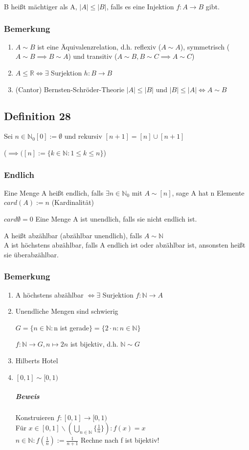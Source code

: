 \documentclass[fleqn]{scrbook}
\begin{document}
B heißt mächtiger als A, $|A| \leq |B|$, falls es eine Injektion $f: A \rightarrow B$ gibt.

\subsubsection{Bemerkung}
\begin{enumerate}[1)]
\item $A \sim B$ ist eine Äquivalenzrelation, d.h. reflexiv ($A \sim A$), symmetrisch ($A \sim B \implies B \sim A$) und transitiv ($A \sim B, B \sim C \implies A \sim C$)
\item $A \leq \mathbb{R} \iff \exists$ Surjektion $h: B \rightarrow B$
\item (Cantor) Bernsten-Schröder-Theorie $|A| \leq |B|$ und $|B| \leq |A| \iff A \sim B$
\end{enumerate}
\subsection{Definition 28}

Sei $n \in \mathbb{N}_0 [0] := \emptyset$ und rekursiv $[n + 1] = [n] \cup [n+1]$

($\implies([n]:=\{k \in \mathbb{N}: 1\leq k \leq n \}$)

\subsubsection{Endlich} Eine Menge A heißt endlich, falls $\exists n \in \mathbb{N}_0$ mit $A \sim [n]$, sage A hat n Elemente $card(A) := n$ (Kardinalität)

$card\emptyset = 0$ Eine Menge A ist unendlich, falls sie nicht endlich ist.

 A heißt abzählbar (abzählbar unendlich), falls $A \sim \mathbb{N}$\\A ist höchstens abzählbar, falls A endlich ist oder abzählbar ist, ansonsten heißt sie überabzählbar.
\subsubsection{Bemerkung}
\begin{enumerate}[1)]
\item A höchstens abzählbar $\iff \exists$ Surjektion $f: \mathbb{N} \rightarrow A$
\item Unendliche Mengen sind schwierig

$G = \{ n \in \mathbb{N}: $n ist gerade$\} = \{2 \cdot n: n \in \mathbb{N}\}$

$f:\mathbb{N}\rightarrow G, n \mapsto 2n$ ist bijektiv, d.h. $\mathbb{N} \sim G$
\item Hilberts Hotel
\item $[0,1]\sim [0,1)$
\subparagraph{Beweis} Konstruieren $f: [0,1] \rightarrow [0,1)$\\Für $x \in [0,1]\backslash (\bigcup_{n\in\mathbb{N}} \{\frac{1}{n}\}):f(x)=x$\\$n\in\mathbb{N}:f(\frac{1}{n}):=\frac{1}{n+1}$ Rechne nach f ist bijektiv!
\end{enumerate}
\end{document}
